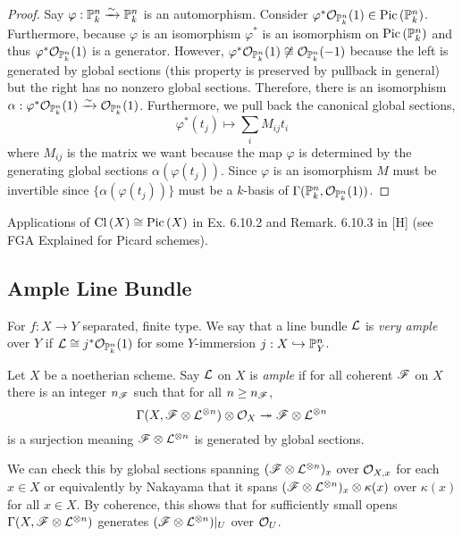 \documentclass[12pt]{article}
\begin{document}
\begin{proof}
Say $\varphi : \mathbb{P}^n_k \xrightarrow{\sim} \mathbb{P}^n_k$ is an automorphism. Consider $\varphi^* \mathcal{O}_{\mathbb{P}^n_k}(1) \in \mathrm{Pic} \left( \mathbb{P}^n_k \right)$. Furthermore, because $\varphi$ is an isomorphism $\varphi^*$ is an isomorphism on $\mathrm{Pic} \left( \mathbb{P}^n_k \right)$ and thus $\varphi^* \mathcal{O}_{\mathbb{P}^n_k}(1)$ is a generator. However, $\varphi^* \mathcal{O}_{\mathbb{P}^n_k}(1) \not\cong \mathcal{O}_{\mathbb{P}^n_k}(-1)$ because the left is generated by global sections (this property is preserved by pullback in general) but the right has no nonzero global sections. Therefore, there is an isomorphism $\alpha : \varphi^* \mathcal{O}_{\mathbb{P}^n_k}(1) \xrightarrow{\sim} \mathcal{O}_{\mathbb{P}^n_k}(1)$. Furthermore, we pull back the canonical global sections,
\[ \varphi^* (t_j) \mapsto \sum_i M_{ij} t_i \]
where $M_{ij}$ is the matrix we want because the map $\varphi$ is determined by the generating global sections $\alpha(\varphi(t_j))$. Since $\varphi$ is an isomorphism $M$ must be invertible since $\{ \alpha(\varphi(t_j)) \}$ must be a $k$-basis of $\Gamma(\mathbb{P}^n_k, \mathcal{O}_{\mathbb{P}^n_k}(1))$.
\end{proof}

\begin{rmk}
Applications of $\mathrm{Cl} \left( X \right) \cong \mathrm{Pic} \left( X \right)$ in Ex. 6.10.2 and Remark. 6.10.3 in [H] (see FGA Explained for Picard schemes). 
\end{rmk}

\subsection{Ample Line Bundle}

\begin{defn}
For $f : X \to Y$ separated, finite type. We say that a line bundle $\mathcal{L}$ is \textit{very ample} over $Y$ if $\mathcal{L} \cong j^* \mathcal{O}_{\mathbb{P}^n_k}(1)$ for some $Y$-immersion $j : X \hookrightarrow \mathbb{P}^n_Y$.
\end{defn}

\begin{defn}
Let $X$ be a noetherian scheme. Say $\mathcal{L}$ on $X$ is \textit{ample} if for all coherent $\mathscr{F}$ on $X$ there is an integer $n_{\mathscr{F}}$ such that for all $n \ge n_{\mathscr{F}}$,
\[ \Gamma(X, \mathscr{F} \otimes \mathcal{L}^{\otimes n}) \otimes \mathcal{O}_{X} \twoheadrightarrow \mathscr{F} \otimes \mathcal{L}^{\otimes n} \]
is a surjection meaning $\mathscr{F} \otimes \mathcal{L}^{\otimes n}$ is generated by global sections.
\end{defn}

\begin{rmk}
We can check this by global sections spanning $(\mathscr{F} \otimes \mathcal{L}^{\otimes n})_x$ over $\mathcal{O}_{X, x}$ for each $x \in X$ or equivalently by Nakayama that it spans $(\mathscr{F} \otimes \mathcal{L}^{\otimes n})_x \otimes \kappa(x)$ over $\kappa(x)$ for all $x \in X$. By coherence, this shows that for sufficiently small opens $\Gamma(X, \mathscr{F} \otimes \mathcal{L}^{\otimes n})$ generates $(\mathscr{F} \otimes \mathcal{L}^{\otimes n})|_U$ over $\mathcal{O}_{U}$.
\end{rmk}
\end{document}
